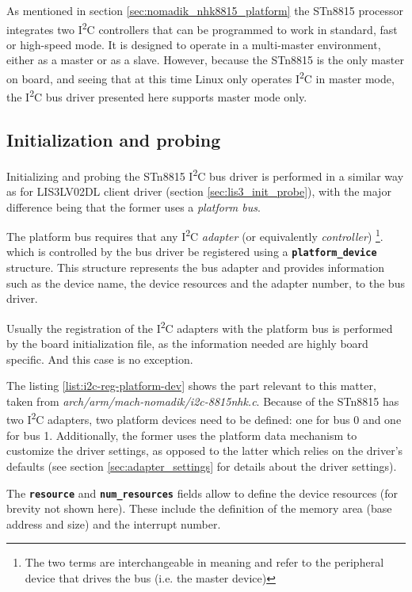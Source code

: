 \documentclass[a4paper,10pt]{article}
\newcommand{\icc}{I\textsuperscript{2}C }
\newcommand{\keyword}[1]{\texttt{\textbf{#1}}}
\begin{document}
\begin{multicols}{2}
As mentioned in section \ref{sec:nomadik_nhk8815_platform} the STn8815 processor
integrates two \icc controllers that can be programmed to work in standard, fast
or high-speed mode. It is designed to operate in a multi-master environment,
either as a master or as a slave. However, because the STn8815 is the only master
on board, and seeing that at this time Linux only operates \icc in master mode, 
the \icc bus driver presented here supports master mode only.


\subsection{Initialization and probing}
\label{sec:adapter_init_probe}
Initializing and probing the STn8815 \icc bus driver is performed in a similar
way as for LIS3LV02DL client driver (section \ref{sec:lis3_init_probe}), with
the major difference being that the former uses a \emph{platform bus}.

The platform bus requires that any \icc \emph{adapter} (or equivalently
\emph{controller})
\footnote{The two terms are interchangeable in meaning and refer to the
peripheral device that drives the bus (i.e. the master device)}.
which is controlled by the bus driver be registered using a \keyword{platform\_device} structure.
This structure represents the bus adapter and provides information such as the
device name, the device resources and the adapter number, to the bus driver.

Usually the registration of the \icc adapters with the platform bus is
performed by the board initialization file, as the information needed are
highly board specific. And this case is no exception.

The listing \ref{list:i2c-reg-platform-dev} shows the part relevant to this
matter, taken from \emph{arch/arm/mach-nomadik/i2c-8815nhk.c}. Because of the
STn8815 has two \icc adapters, two platform devices need to be defined: one for
bus 0 and one for bus 1.
Additionally, the former uses the platform data mechanism to customize the
driver settings, as opposed to the latter which relies on the driver's defaults
(see section \ref{sec:adapter_settings} for details about the driver settings).

The \keyword{resource} and \keyword{num\_resources} fields allow to define
the device resources (for brevity not shown here). These include the
definition of the memory area (base address and size) and the interrupt number.


\end{multicols}
\end{document}
